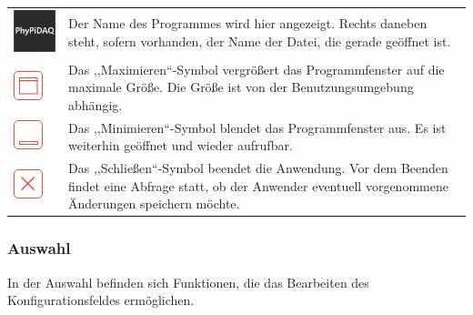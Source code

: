 \documentclass[parskip=full]{scrartcl}
\begin{document}
\begin{tabular}[t]{p{1cm} p{10cm}} %
	\vspace{0cm}\includegraphics[width = 1 cm]{Grafik/PhyPiDAQ.png} & Der Name des Programmes wird hier angezeigt. Rechts daneben steht, sofern vorhanden, der Name der Datei, die gerade geöffnet ist.\newline\\
	\vspace{0cm}\includegraphics[width = 1 cm]{Grafik/Maximieren.png} & Das ,,Maximieren``-Symbol vergrößert das Programmfenster auf die maximale Größe. Die Größe ist von der Benutzungsumgebung abhängig.\newline\\
	\vspace{0cm}\includegraphics[width = 1 cm]{Grafik/Minimieren.png} & Das ,,Minimieren``-Symbol blendet das Programmfenster aus. Es ist weiterhin geöffnet und wieder aufrufbar. \\
	\vspace{0cm}\includegraphics[width = 1 cm]{Grafik/Schliessen.png} & Das ,,Schließen``-Symbol beendet die Anwendung. Vor dem Beenden findet eine Abfrage statt, ob der Anwender eventuell vorgenommene Änderungen speichern möchte.\\
\end{tabular}

\subsubsection{Auswahl}

In der Auswahl befinden sich Funktionen, die das Bearbeiten des Konfigurationsfeldes ermöglichen.
\end{document}
